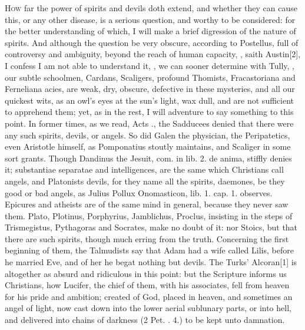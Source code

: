 {{\lettrine{H}{ow} far the power of spirits and devils doth extend, and whether they
can cause this, or any other disease, is a serious question, and worthy
to be considered: for the better understanding of which, I will make a
brief digression of the nature of spirits. And although the question be
very obscure, according to Postellus, full of controversy and
ambiguity, beyond the reach of human capacity, , saith Austin[2\baselineskip], I confess I am not able to
understand it, , we can sooner
determine with Tully, ,
our subtle schoolmen, Cardans, Scaligers, profound Thomists,
Fracastoriana and Ferneliana acies, are weak, dry, obscure, defective
in these mysteries, and all our quickest wits, as an owl's eyes at the
sun's light, wax dull, and are not sufficient to apprehend them; yet,
as in the rest, I will adventure to say something to this point. In
former times, as we read, Acts ., the Sadducees denied that there
were any such spirits, devils, or angels. So did Galen the physician,
the Peripatetics, even Aristotle himself, as Pomponatius stoutly
maintains, and Scaliger in some sort grants. Though Dandinus the
Jesuit, com. in lib. 2. de anima, stiffly denies it; substantiae
separatae and intelligences, are the same which Christians call angels,
and Platonists devils, for they name all the spirits, daemones, be they
good or bad angels, as Julius Pollux Onomasticon, lib. 1. cap. 1.
observes. Epicures and atheists are of the same mind in general,
because they never saw them. Plato, Plotinus, Porphyrius, Jamblichus,
Proclus, insisting in the steps of \textlatin{Trismegistus}, Pythagoras and
Socrates, make no doubt of it: nor Stoics, but that there are such
spirits, though much erring from the truth. Concerning the first
beginning of them, the Talmudists say that Adam had a wife called
Lilis, before he married Eve, and of her he begat nothing but devils.
The Turks' Alcoran[1\baselineskip] is altogether as absurd and ridiculous in this
point: but the Scripture informs us Christians, how Lucifer, the chief
of them, with his associates, fell from heaven for his pride and
ambition; created of God, placed in heaven, and sometimes an angel of
light, now cast down into the lower aerial sublunary parts, or into
hell, and delivered into chains of darkness (2 Pet. . 4.) to be kept
unto damnation.

}}
